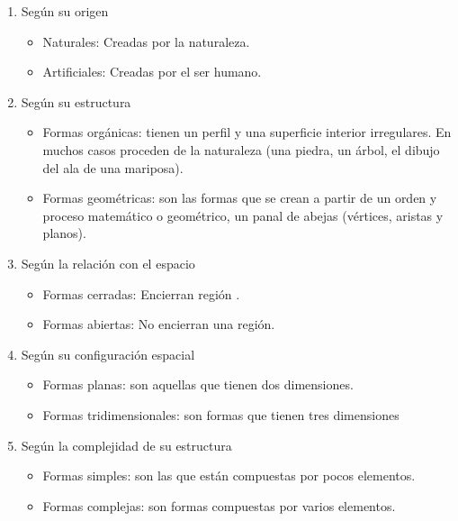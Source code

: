 \documentclass[
  11pt,
]{krantz}
\providecommand{\tightlist}{%
  \setlength{\itemsep}{0pt}\setlength{\parskip}{0pt}}
\theoremstyle{definition}
\theoremstyle{definition}
\theoremstyle{definition}
\theoremstyle{definition}
\theoremstyle{remark}
\begin{document}
\begin{enumerate}
\def\labelenumi{\arabic{enumi}.}
\tightlist
\item
  Según su origen

  \begin{itemize}
  \tightlist
  \item
    Naturales: Creadas por la naturaleza.
  \item
    Artificiales: Creadas por el ser humano.
  \end{itemize}
\item
  Según su estructura

  \begin{itemize}
  \tightlist
  \item
    Formas orgánicas: tienen un perfil y una superficie interior irregulares. En muchos casos proceden de la naturaleza (una piedra, un árbol, el dibujo del ala de una mariposa).
  \item
    Formas geométricas: son las formas que se crean a partir de un orden y proceso matemático o geométrico, un panal de abejas (vértices, aristas y planos).
  \end{itemize}
\item
  Según la relación con el espacio

  \begin{itemize}
  \tightlist
  \item
    Formas cerradas: Encierran región .
  \item
    Formas abiertas: No encierran una región.
  \end{itemize}
\item
  Según su configuración espacial

  \begin{itemize}
  \tightlist
  \item
    Formas planas: son aquellas que tienen dos dimensiones.
  \item
    Formas tridimensionales: son formas que tienen tres dimensiones
  \end{itemize}
\item
  Según la complejidad de su estructura

  \begin{itemize}
  \tightlist
  \item
    Formas simples: son las que están compuestas por pocos elementos.
  \item
    Formas complejas: son formas compuestas por varios elementos.
  \end{itemize}
\end{enumerate}
\end{document}
